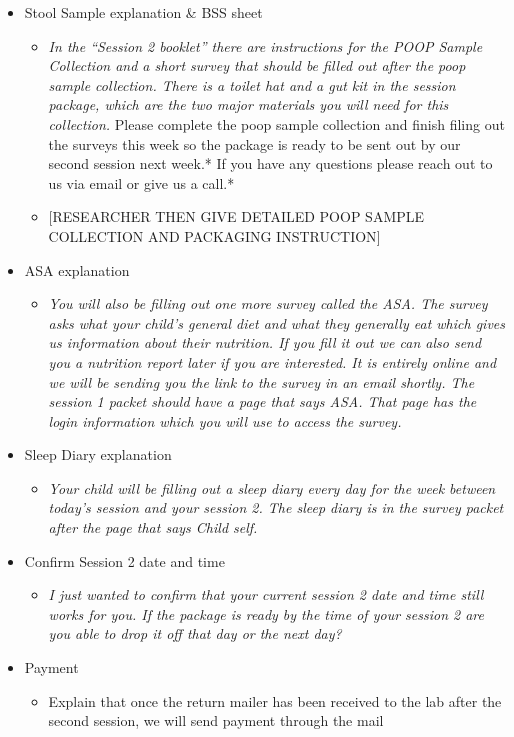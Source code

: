 \documentclass[
]{book}
\providecommand{\tightlist}{%
  \setlength{\itemsep}{0pt}\setlength{\parskip}{0pt}}
\begin{document}
\begin{itemize}
\item
  Stool Sample explanation \& BSS sheet

  \begin{itemize}
  \item
    \emph{In the ``Session 2 booklet'' there are instructions for the POOP Sample Collection and a short survey that should be filled out after the poop sample collection. There is a toilet hat and a gut kit in the session package, which are the two major materials you will need for this collection. }Please complete the poop sample collection and finish filing out the surveys this week so the package is ready to be sent out by our second session next week.* If you have any questions please reach out to us via email or give us a call.*
  \item
    {[}RESEARCHER THEN GIVE DETAILED POOP SAMPLE COLLECTION AND PACKAGING INSTRUCTION{]}
  \end{itemize}
\item
  ASA explanation

  \begin{itemize}
  \tightlist
  \item
    \emph{You will also be filling out one more survey called the ASA. The survey asks what your child's general diet and what they generally eat which gives us information about their nutrition. If you fill it out we can also send you a nutrition report later if you are interested. It is entirely online and we will be sending you the link to the survey in an email shortly. The session 1 packet should have a page that says ASA. That page has the login information which you will use to access the survey. }
  \end{itemize}
\item
  Sleep Diary explanation

  \begin{itemize}
  \tightlist
  \item
    \emph{Your child will be filling out a sleep diary every day for the week between today's session and your session 2. The sleep diary is in the survey packet after the page that says Child self.}
  \end{itemize}
\item
  Confirm Session 2 date and time

  \begin{itemize}
  \tightlist
  \item
    \emph{I just wanted to confirm that your current session 2 date and time still works for you. If the package is ready by the time of your session 2 are you able to drop it off that day or the next day?}
  \end{itemize}
\item
  Payment

  \begin{itemize}
  \tightlist
  \item
    Explain that once the return mailer has been received to the lab after the second session, we will send payment through the mail
  \end{itemize}
\end{itemize}
\end{document}
